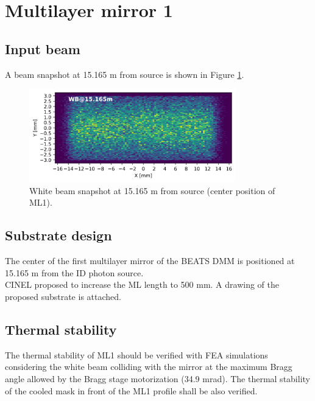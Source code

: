 \section{Multilayer mirror 1}
\subsection{Input beam}
A beam snapshot at 15.165 m from source is shown in Figure \ref{fig:snapshot_ML1}.
\begin{figure}[ht]
\centering
\includegraphics[width=0.8\textwidth]{./../../beam_snapshots/WB_snapshot_15.165.png}
\caption{\label{fig:snapshot_ML1} White beam snapshot at 15.165 m from source (center position of ML1).}
\end{figure}

\subsection{Substrate design}
The center of the first multilayer mirror of the BEATS DMM is positioned at 15.165 m from the ID photon source. \\
CINEL proposed to increase the ML length to 500 mm. A drawing of the proposed substrate is attached.


\clearpage


\clearpage
\subsection{Thermal stability}
The thermal stability of ML1 should be verified with FEA simulations considering the white beam colliding with the mirror at the maximum Bragg angle allowed by the Bragg stage motorization (34.9 mrad). The thermal stability of the cooled mask in front of the ML1 profile shall be also verified.\\

